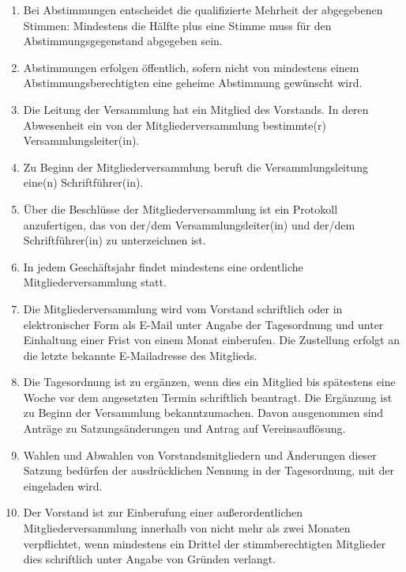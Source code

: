 \documentclass[12pt,a4paper,draft]{article}
\begin{document}
\begin{enumerate}
\item Bei Abstimmungen entscheidet die qualifizierte Mehrheit der abgegebenen 
Stimmen: Mindestens die Hälfte plus eine Stimme muss für den Abstimmungsgegenstand
abgegeben sein.

\item Abstimmungen erfolgen öffentlich, sofern nicht von mindestens einem 
Abstimmungsberechtigten eine geheime Abstimmung gewünscht wird.

\item Die Leitung der Versammlung hat ein Mitglied des Vorstands.  In deren Abwesenheit ein von 
der Mitgliederversammlung bestimmte(r) Versammlungsleiter(in).

\item Zu Beginn der Mitgliederversammlung beruft die Versammlungsleitung eine(n) Schriftführer(in).

\item Über die Beschlüsse der Mitgliederversammlung ist ein Protokoll 
anzufertigen, das von der/dem Versammlungsleiter(in) und der/dem 
Schriftführer(in) zu unterzeichnen ist.


\item In jedem Geschäftsjahr findet mindestens eine ordentliche 
Mitgliederversammlung statt.

\item Die Mitgliederversammlung wird vom Vorstand schriftlich oder in 
elektronischer Form als E-Mail unter Angabe der Tagesordnung und unter 
Einhaltung einer Frist von einem Monat einberufen. %
Die Zustellung erfolgt an die letzte bekannte E-Mailadresse des Mitglieds.

\item Die Tagesordnung ist zu ergänzen, wenn dies ein Mitglied bis spätestens 
eine Woche vor dem angesetzten Termin schriftlich beantragt. Die Ergänzung 
ist zu Beginn der Versammlung bekanntzumachen. Davon ausgenommen sind Anträge zu Satzungsänderungen und Antrag auf Vereinsauflösung.

\item Wahlen und Abwahlen von Vorstandsmitgliedern und Änderungen dieser 
Satzung bedürfen der ausdrücklichen Nennung in der Tagesordnung, mit der 
eingeladen wird.

\item Der Vorstand ist zur Einberufung einer außerordentlichen 
Mitgliederversammlung innerhalb von nicht mehr als zwei Monaten verpflichtet, 
wenn mindestens ein Drittel der stimmberechtigten Mitglieder dies schriftlich unter Angabe von 
Gründen verlangt. %


\end{enumerate}
\end{document}
